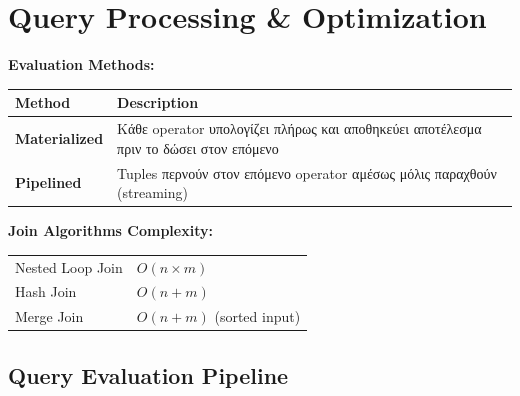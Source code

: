 
\chapter{Query Processing \& Optimization}

\begin{formulabox}
\textbf{Evaluation Methods:}
\begin{center}
\begin{tabular}{lp{9cm}}
\toprule
\textbf{Method} & \textbf{Description} \\
\midrule
\textbf{Materialized} & Κάθε operator υπολογίζει πλήρως και αποθηκεύει αποτέλεσμα πριν το δώσει στον επόμενο \\
\textbf{Pipelined} & Tuples περνούν στον επόμενο operator αμέσως μόλις παραχθούν (streaming) \\
\bottomrule
\end{tabular}
\end{center}

\textbf{Join Algorithms Complexity:}
\begin{center}
\begin{tabular}{ll}
Nested Loop Join & $O(n \times m)$ \\
Hash Join & $O(n + m)$ \\
Merge Join & $O(n + m)$ (sorted input) \\
\end{tabular}
\end{center}
\end{formulabox}

\section{Query Evaluation Pipeline}

